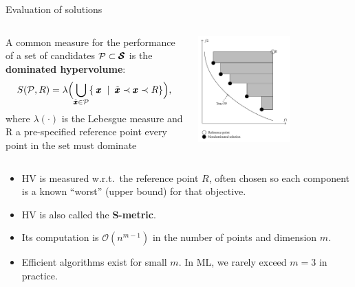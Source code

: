 \documentclass[11pt,compress,t,notes=noshow,xcolor=table]{beamer}
\begin{document}
\begin{vbframe}{Evaluation of solutions}

\begin{columns}
\begin{column}{0.5\textwidth}
{\footnotesize A common measure for the performance of a set of candidates 
\(\mathcal{P}\subset\pmb{\mathcal{S}}\) is the \textbf{dominated hypervolume}:
\[
S(\mathcal{P},R) 
  = \lambda\Bigl(
      \bigcup_{\tilde{\pmb{x}}\in \mathcal{P}} 
         \{\;\pmb{x} \;\mid\; 
              \tilde{\pmb{x}}\prec \pmb{x} \prec R
         \}
    \Bigr),
\]
where \(\lambda(\cdot)\) is the Lebesgue measure and R a pre-specified reference point every point in the set must dominate}
\end{column}
\begin{column}{0.5\textwidth}
\begin{center}
\includegraphics[width=0.6\textwidth]{slides/11-multicrit/figure_man/dominated_hypervolume.png}
\end{center}
\end{column}
\end{columns}



{\footnotesize
\begin{itemize}
\item HV is measured w.r.t.\ the reference point \(R\), often chosen so each 
      component is a known “worst” (upper bound) for that objective.
\item HV is also called the \textbf{S-metric}.
\item Its computation is \(\mathcal{O}(n^{m-1})\) in the number of points 
      and dimension \(m\).
\item Efficient algorithms exist for small \(m\). 
      In ML, we rarely exceed \(m=3\) in practice.
\end{itemize}
}

\end{vbframe}

\endlecture
\end{document}
